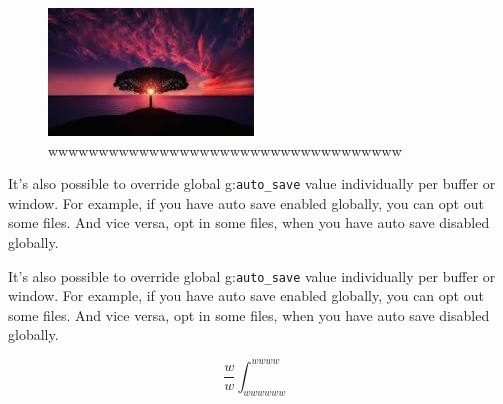\begin{frame}
	\begin{figure}
		\begin{center}
			\includegraphics[width=0.3\linewidth]{screenshot002}
		\end{center}
		\caption{wwwwwwwwwwwwwwwwwwwwwwwwwwwwwwwwwww}
		\label{fig:}
	\end{figure}
	It's also possible to override global g:\lstinline{auto_save} value individually per buffer or window. For example, if you have auto save enabled globally, you can opt out some files. And vice versa, opt in some files, when you have auto save disabled globally.

	It's also possible to override global g:\lstinline{auto_save} value individually per buffer or window. For example, if you have auto save enabled globally, you can opt out some files. And vice versa, opt in some files, when you have auto save disabled globally.

     
	\begin{equation}
		\frac{w}{w}	\int_{wwwwww}^{wwww}
		\label{www}
	\end{equation}

\end{frame}


